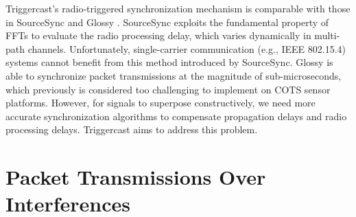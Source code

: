 \documentclass[conference]{IEEEtran}
\begin{document}
\indent Triggercast's radio-triggered synchronization mechanism is comparable with those in SourceSync \cite{rahul2010sourcesync} and Glossy \cite{ferrari11Glossy}.
SourceSync exploits the fundamental property of FFTs to evaluate the radio processing delay, which varies
dynamically in multi-path channels.
Unfortunately, single-carrier communication (e.g., IEEE 802.15.4) systems cannot benefit from this method introduced by SourceSync.
Glossy is able to synchronize packet transmissions at the magnitude of sub-microseconds, which previously is considered too challenging to implement on COTS sensor platforms.
However, for signals to superpose constructively, we need more accurate synchronization algorithms to
compensate propagation delays and radio processing delays.
Triggercast aims to address this problem. \\


\section{Packet Transmissions Over Interferences}
\end{document}
